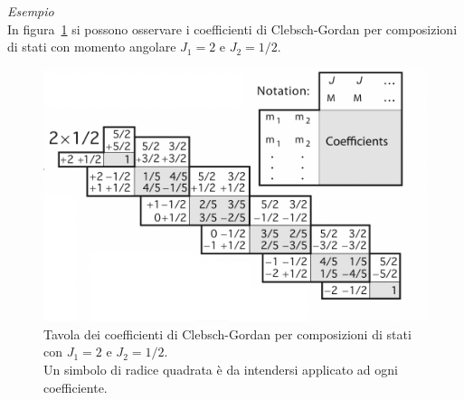 \emph{Esempio} \\
In figura~\ref{fig:clebsch-gordan-table} si possono osservare i coefficienti di Clebsch-Gordan per composizioni di stati con
momento angolare $J_1=2$ e $ J_2 = 1/2$.
\begin{figure}
    \centering
    \includegraphics{../figs/clebsch-gordan-table}
    \caption{Tavola dei coefficienti di Clebsch-Gordan per composizioni di stati con
        $J_1=2$ e $ J_2 = 1/2$. \\
        Un simbolo di radice quadrata è da intendersi applicato ad ogni coefficiente.}
    \label{fig:clebsch-gordan-table}
\end{figure}

